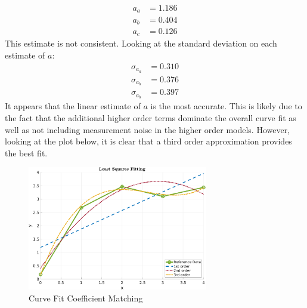 \documentclass[11pt]{article}
\begin{document}
\begin{enumerate}[label=\textbf{\arabic*.}]
  \begin{equation*}
    \begin{split}
      a_a &= 1.186 \\
      a_b &= 0.404 \\
      a_c &= 0.126
    \end{split}
  \end{equation*}
  This estimate is not consistent. Looking at the standard deviation on each 
  estimate of $a$:
  \begin{equation*}
    \begin{split}
      \sigma_{a_a} &= 0.310 \\
      \sigma_{a_b} &= 0.376 \\
      \sigma_{a_b} &= 0.397
    \end{split}
  \end{equation*}
  It appears that the linear estimate of $a$ is the most accurate. This is likely 
  due to the fact that the additional higher order terms dominate the overall 
  curve fit as well as not including measurement noise in the higher order models. 
  However, looking at the plot below, it is clear that a third order approximation 
  provides the best fit.
  \begin{figure}[H]
    \centering
    \includegraphics[width=0.7\textwidth]{p2.png}
    \caption{Curve Fit Coefficient Matching}
  \end{figure}


\end{enumerate}
\end{document}
